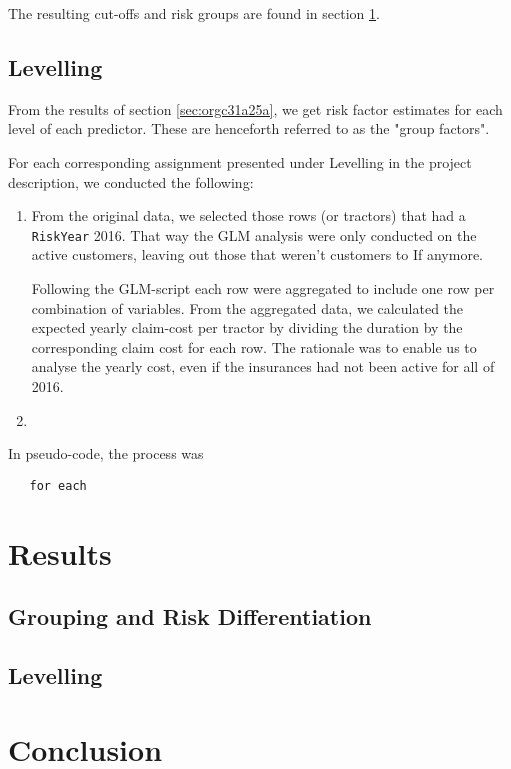 \documentclass[11pt]{article}
\begin{document}
The resulting cut-offs and risk groups are found in section \ref{sec:org73a0f29}.

\subsection{Levelling}
\label{sec:org82717ed}

From the results of section \ref{sec:orgc31a25a}, we get risk factor estimates for each
level of each predictor. These are henceforth referred to as the "group factors".

For each corresponding assignment presented under Levelling in the project description, we conducted the
following:

\begin{enumerate}
\item From the original data, we selected those rows (or tractors) that had a \texttt{RiskYear} 2016. That 
way the GLM analysis were only conducted on the active customers, leaving out those that weren't 
customers to If anymore.

Following the GLM-script each row were aggregated to include one row per combination of variables. 
From the aggregated data, we calculated the expected yearly claim-cost per tractor by dividing the
duration by the corresponding claim cost for each row. The rationale was to enable us to analyse the 
yearly cost, even if the insurances had not been active for all of 2016.

\item 
\end{enumerate}


In pseudo-code, the process was 

\begin{verbatim}
   for each 
\end{verbatim}

\section{Results}
\label{sec:org73a0f29}
\subsection{Grouping and Risk Differentiation}
\label{sec:org1c88ca1}

\subsection{Levelling}
\label{sec:orga0f5b00}




\section{Conclusion}
\label{sec:orgc79e91f}
\end{document}
